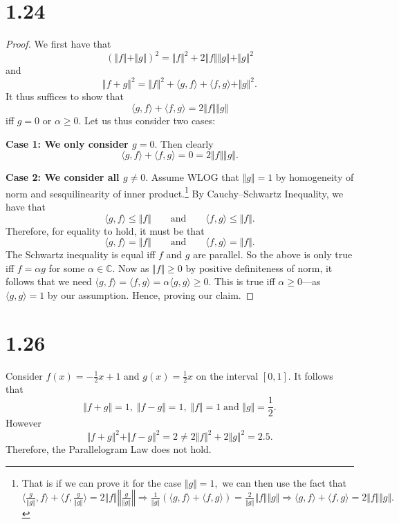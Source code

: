 \documentclass[10pt]{article}
\begin{document}
\section*{1.24}

\begin{proof}
    We first have that
    \[(\Vert f\Vert + \Vert g\Vert)^2 = \Vert f\Vert^2 + 2\Vert f\Vert\Vert g\Vert+\Vert g\Vert^2\]
    and
    \[\Vert f + g\Vert^2 = \Vert f\Vert^2 + \langle g,f\rangle + \langle f,g \rangle + \Vert g\Vert^2.\]
    It thus suffices to show that
    \[\langle g,f\rangle + \langle f,g\rangle =2\Vert f\Vert\Vert g\Vert\]
    iff $g=0$ or $\alpha \ge 0.$ Let us thus consider two cases:

    \noindent
    \textbf{Case 1: We only consider $g=0.$} Then clearly
    \[\langle g,f\rangle + \langle f,g\rangle = 0 = 2\Vert f\Vert\Vert g\Vert.\]

    \noindent
    \textbf{Case 2: We consider all $g\neq 0.$}  Assume WLOG that $\Vert g\Vert =1$ by homogeneity of norm and sesquilinearity of inner product.\footnote{That is if we can prove it for the case $\Vert g\Vert = 1,$ we can then use the fact that
    $\langle \frac{g}{\Vert g\Vert},f\rangle + \langle f,\frac{g}{\Vert g\Vert}\rangle =2\Vert f\Vert\left\Vert \frac{g}{\Vert g\Vert}\right\Vert\Rightarrow \frac{1}{\Vert g\Vert} (\langle g,f\rangle + \langle f,g\rangle) = \frac{2}{\Vert g\Vert}\Vert f\Vert \Vert g\Vert \Rightarrow \langle g,f\rangle + \langle f,g\rangle =2\Vert f\Vert\Vert g\Vert.$
    } By Cauchy--Schwartz Inequality, we have that
    \[\langle g,f\rangle \le \Vert f\Vert\qquad\text{and}\qquad \langle f,g\rangle \le \Vert f\Vert.\]
    Therefore, for equality to hold, it must be that
    \[\langle g,f\rangle = \Vert f\Vert\qquad\text{and}\qquad\langle f,g\rangle = \Vert f\Vert. \]
    The Schwartz inequality is equal iff $f$ and $g$ are parallel. So the above is only true iff $f=\alpha g$ for some $\alpha \in \mathbb{C}.$ Now as $\Vert f \Vert \ge 0$ by positive definiteness of norm, it follows that we need $\langle g,f\rangle = \langle f,g\rangle = \alpha\langle g,g\rangle \ge 0.$ This is true iff $\alpha \ge 0$---as $\langle g,g\rangle=1$ by our assumption. Hence, proving our claim. 
\end{proof}

\section*{1.26}

Consider $f(x)=-\frac{1}{2}x+1$ and $g(x)=\frac{1}{2}x$ on the interval $[0,1].$ It follows that
\[\Vert f+g\Vert = 1,\; \Vert f-g\Vert =1,\; \Vert f\Vert = 1\;\text{and } \Vert g\Vert = \frac{1}{2}.\]
However
\[\Vert f+g\Vert^2 + \Vert f-g\Vert^2 = 2 \neq2\Vert f\Vert^2 + 2\Vert g\Vert^2 = 2.5.\]
Therefore, the Parallelogram Law does not hold.
\newpage
\end{document}
